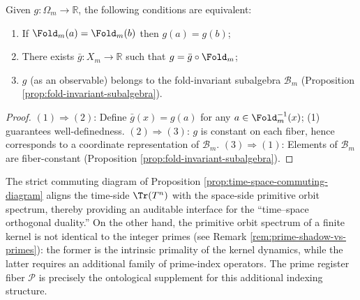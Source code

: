 \begin{proposition}\label{prop:pom-fiber-invariance}
Given $g:\Omega_m\to\mathbb{R}$, the following conditions are equivalent:
\begin{enumerate}
  \item If $\Fold_m(a)=\Fold_m(b)$ then $g(a)=g(b)$;
  \item There exists $\bar g:X_m\to\mathbb{R}$ such that $g=\bar g\circ\Fold_m$;
  \item $g$ (as an observable) belongs to the fold-invariant subalgebra $\mathcal{B}_m$ (Proposition \ref{prop:fold-invariant-subalgebra}).
\end{enumerate}
\end{proposition}
\begin{proof}
$(1)\Rightarrow(2)$: Define $\bar g(x)=g(a)$ for any $a\in\Fold_m^{-1}(x)$; (1) guarantees well-definedness. $(2)\Rightarrow(3)$: $g$ is constant on each fiber, hence corresponds to a coordinate representation of $\mathcal{B}_m$. $(3)\Rightarrow(1)$: Elements of $\mathcal{B}_m$ are fiber-constant (Proposition \ref{prop:fold-invariant-subalgebra}).
\end{proof}

\begin{remark}\label{rem:pom-time-space}
The strict commuting diagram of Proposition \ref{prop:time-space-commuting-diagram} aligns the time-side $\Tr(T^n)$ with the space-side primitive orbit spectrum, thereby providing an auditable interface for the ``time--space orthogonal duality.'' On the other hand, the primitive orbit spectrum of a finite kernel is not identical to the integer primes (see Remark \ref{rem:prime-shadow-vs-primes}): the former is the intrinsic primality of the kernel dynamics, while the latter requires an additional family of prime-index operators. The prime register fiber $\mathcal{P}$ is precisely the ontological supplement for this additional indexing structure.
\end{remark}


